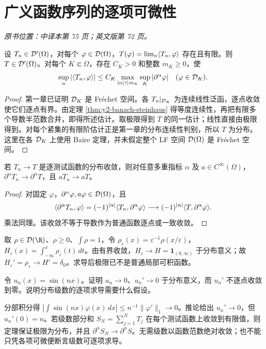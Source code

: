 \section{广义函数序列的逐项可微性}\label{sec:yosida-02-03}
\noindent\textit{原书位置：中译本第 75 页；英文版第 72 页。}

\begin{theorem}[分布的逐测试函数极限]\label{thm:y2-distribution-limit}
设 $T_n\in\mathcal{D}'(\Omega)$，对每个 $\varphi\in\mathcal{D}(\Omega)$，$T(\varphi)=\lim_n\langle T_n,\varphi\rangle$ 存在且有限。则 $T\in\mathcal{D}'(\Omega)$。对每个 $K\Subset\Omega$，存在 $C_K>0$ 和整数 $m_K\ge0$，使
\[
 \sup_n|\langle T_n,\varphi\rangle|\le C_K
 \max_{|\alpha|\le m_K}\sup_K|\partial^\alpha\varphi|
 \quad(\varphi\in\mathcal{D}_K).
\]
\end{theorem}
\begin{proof}
第一章已证明 $\mathcal{D}_K$ 是 Fr\'echet 空间。各 $T_n|_{\mathcal{D}_K}$ 为连续线性泛函，逐点收敛使它们逐点有界。由定理 \ref{thm:y2-banach-steinhaus} 得等度连续性，再把有限多个导数半范数合并，即得所述估计。取极限得到 $T$ 的同一估计；线性直接由极限得到。对每个紧集的有限阶估计正是第一章的分布连续性判别，所以 $T$ 为分布。这里在各 $\mathcal{D}_K$ 上使用 Baire 定理，并未假定整个 LF 空间 $\mathcal{D}(\Omega)$ 是 Fr\'echet 空间。
\end{proof}

\begin{corollary}[逐项求导与光滑乘法]\label{cor:y2-termwise}
若 $T_n\to T$ 是逐测试函数的分布收敛，则对任意多重指标 $\alpha$ 及 $a\in C^\infty(\Omega)$，$\partial^\alpha T_n\to\partial^\alpha T$，且 $aT_n\to aT$。
\end{corollary}
\begin{proof}
对固定 $\varphi$，$\partial^\alpha\varphi,a\varphi\in\mathcal{D}(\Omega)$，且
\[
 \langle \partial^\alpha T_n,\varphi\rangle
 =(-1)^{|\alpha|}\langle T_n,\partial^\alpha\varphi\rangle
 \longrightarrow(-1)^{|\alpha|}\langle T,\partial^\alpha\varphi\rangle.
\]
乘法同理。该收敛不等于导数作为普通函数逐点或一致收敛。
\end{proof}

\begin{example}
取 $\rho\in\Test(\R)$、$\rho\ge0$、$\int\rho=1$，令 $\rho_\varepsilon(x)=\varepsilon^{-1}\rho(x/\varepsilon)$，$H_\varepsilon(x)=\int_{-\infty}^x\rho_\varepsilon(t)\,dt$。由有界收敛，$H_\varepsilon\to H=\mathbf1_{(0,\infty)}$ 于分布意义；故 $H_\varepsilon'=\rho_\varepsilon\to H'=\delta_0$。求导后极限已不是普通局部可积函数。
\end{example}

\begin{exercise}
令 $u_n(x)=\sin(nx)$。证明 $u_n\to0$、$u_n'\to0$ 于分布意义，而 $u_n'$ 不逐点收敛到零。说明分布级数的逐项求导需要什么假设。
\end{exercise}
\begin{solution}
分部积分得 $|\int\sin(nx)\varphi(x)\,dx|\le n^{-1}\|\varphi'\|_1\to0$。推论给出 $u_n'\to0$，但 $u_n'(0)=n$。若级数部分和 $S_N=\sum_{j=1}^NT_j$ 在每个测试函数上收敛到有限值，则定理保证极限为分布，并且 $\partial^\alpha S_N\to\partial^\alpha S$。无需级数以函数范数绝对收敛；也不能只凭各项可微便断言级数可逐项求导。
\end{solution}
